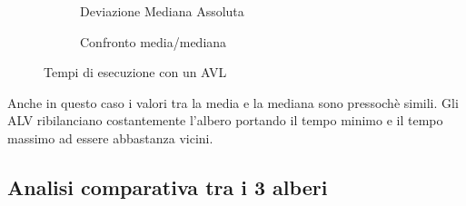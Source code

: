 \documentclass[a4paper,titlepage]{article}
\begin{document}
\begin{figure}[h]
  \centering
  \begin{subfigure}{\textwidth}
    \captionsetup{justification=centering}
     \caption{Deviazione Mediana Assoluta}
     \label{fig:avl_mad}
  \end{subfigure}%
  \vspace{2pt}
  \begin{subfigure}{\textwidth}
    \captionsetup{justification=centering}
     \caption{Confronto media/mediana}
     \label{fig:avl_mean_median}
  \end{subfigure}
  \caption{Tempi di esecuzione con un AVL}
\end{figure}

Anche in questo caso i valori tra la media e la mediana sono pressochè simili. Gli ALV ribilanciano costantemente l'albero portando il tempo minimo e il tempo massimo ad essere abbastanza vicini.
\newpage

\subsection{Analisi comparativa tra i 3 alberi}
\end{document}
